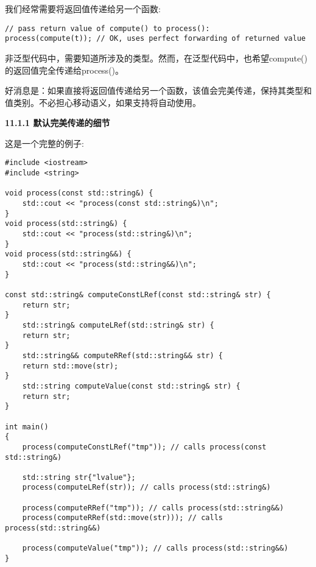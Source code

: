我们经常需要将返回值传递给另一个函数:\par

\begin{lstlisting}[caption={}]
// pass return value of compute() to process():
process(compute(t)); // OK, uses perfect forwarding of returned value
\end{lstlisting}

非泛型代码中，需要知道所涉及的类型。然而，在泛型代码中，也希望compute()的返回值完全传递给process()。\par

好消息是：如果直接将返回值传递给另一个函数，该值会完美传递，保持其类型和值类别。不必担心移动语义，如果支持将自动使用。\par

\hspace*{\fill} \par %
\textbf{11.1.1 默认完美传递的细节}

这是一个完整的例子:\par

{\color{red}{generic/perfectpassing.cpp}}\par

\begin{lstlisting}[caption={}]
#include <iostream>
#include <string>

void process(const std::string&) {
	std::cout << "process(const std::string&)\n";
}
void process(std::string&) {
	std::cout << "process(std::string&)\n";
}
void process(std::string&&) {
	std::cout << "process(std::string&&)\n";
}

const std::string& computeConstLRef(const std::string& str) {
	return str;
}
	std::string& computeLRef(std::string& str) {
	return str;
}
	std::string&& computeRRef(std::string&& str) {
	return std::move(str);
}
	std::string computeValue(const std::string& str) {
	return str;
}

int main()
{
	process(computeConstLRef("tmp")); // calls process(const std::string&)
	
	std::string str{"lvalue"};
	process(computeLRef(str)); // calls process(std::string&)
	
	process(computeRRef("tmp")); // calls process(std::string&&)
	process(computeRRef(std::move(str))); // calls process(std::string&&)
	
	process(computeValue("tmp")); // calls process(std::string&&)
}
\end{lstlisting}

